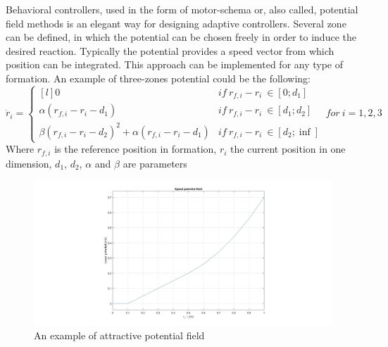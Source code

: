 \documentclass[a4paper, 12pt]{report}
\begin{document}
Behavioral controllers, used in the form of motor-schema or, also called, potential field methods \cite{Arkin1999, Pugh2009} is an elegant way for designing adaptive controllers. Several zone can be defined, in which the potential can be chosen freely in order to induce the desired reaction. Typically the potential provides a speed vector from which position can be integrated. This approach can be implemented for any type of formation. An example of three-zones potential could be the following:
\[ \dot r_i =  \left\{ \begin{matrix*}[l] 0 & if\ r_{f,i}-r_i\ \in [0; d_1] \\ \alpha(r_{f,i}-r_i-d_1) & if\ r_{f,i}-r_i\ \in [d_1; d_2] \\  \beta(r_{f,i}-r_i-d_2)^2 + \alpha(r_{f,i}-r_i-d_1) & if\ r_{f,i}-r_i\ \in [d_2; \inf] \end{matrix*} \right. \ for\ i = 1,2,3\]
Where $r_{f,i}$ is the reference position in formation, $r_i$ the current position in one dimension, $d_1$, $d_2$, $\alpha$ and $\beta$ are parameters

\begin{figure}[htbp]
\centering
\includegraphics[width=.8\textwidth]{Images/potentialEx}
\caption{An example of attractive potential field}
\label{fig:potentialEx}
\end{figure}
\end{document}
